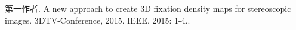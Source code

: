 
\begin{publications}{99}
    \item\textsc{第一作者}. {A new approach to create 3D fixation density maps for stereoscopic images}. 3DTV-Conference, 2015. IEEE, 2015: 1-4..
\end{publications}
